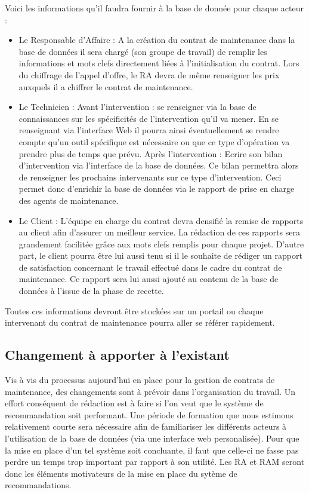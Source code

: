 Voici les informations qu'il faudra fournir à la base de donnée pour chaque acteur : 
\begin{itemize}
\item Le Responsable d'Affaire : A la création du contrat de maintenance dans la base de données il sera chargé (son groupe de travail) de remplir les informations et mots clefs directement liées à l'initialisation du contrat. Lors du chiffrage de l'appel d'offre, le RA devra de même renseigner les prix auxquels il a chiffrer le contrat de maintenance.
\item Le Technicien : Avant l'intervention : se renseigner via la base de connaissances sur les spécificités de l'intervention qu'il va mener. En se renseignant via l'interface Web il pourra ainsi éventuellement se rendre compte qu'un outil spécifique est nécessaire ou que ce type d'opération va prendre plus de temps que prévu.
Après l'intervention : Ecrire son bilan d'intervention via l'interface de la base de données. Ce bilan permettra alors de renseigner les prochains intervenants sur ce type d'intervention. Ceci permet donc d'enrichir la base de données via le rapport de prise en charge des agents de maintenance.
\item Le Client : L'équipe en charge du contrat devra densifié la remise de rapports au client afin d'assurer un meilleur service. La rédaction de ces rapports sera grandement facilitée grâce aux mots clefs remplis pour chaque projet. D'autre part, le client pourra être lui aussi tenu si il le souhaite de rédiger un rapport de satisfaction concernant le travail effectué dans le cadre du contrat de maintenance. Ce rapport sera lui aussi ajouté au contenu de la base de données à l'issue de la phase de recette.
\end{itemize}
Toutes ces informations devront être stockées sur un portail ou chaque intervenant du contrat de maintenance pourra aller se référer rapidement.

\subsection{Changement à apporter à l'existant}
Vis à vis du processus aujourd'hui en place pour la gestion de contrats de maintenance, des changements sont à prévoir dans l'organisation du travail. Un effort conséquent de rédaction est à faire si l'on veut que le système de recommandation soit performant. Une période de formation que nous estimons relativement courte sera nécessaire afin de familiariser les différents acteurs à l'utilisation de la base de données (via une interface web personalisée). Pour que la mise en place d'un tel système soit concluante, il faut que celle-ci ne fasse pas perdre un temps trop important par rapport à son utilité. Les RA et RAM seront donc les éléments motivateurs de la mise en place du sytème de recommandations.

